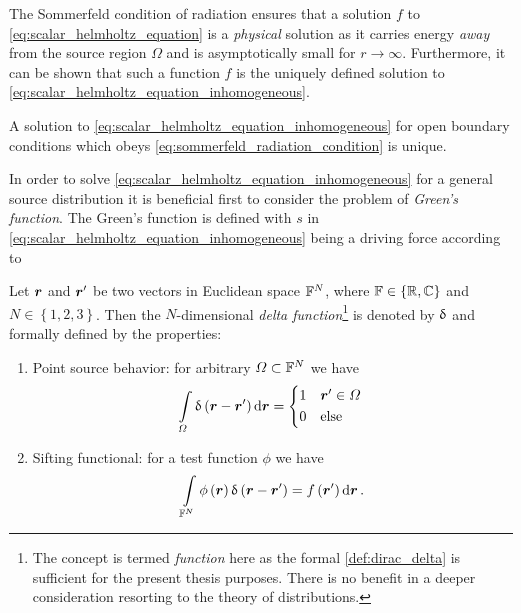 The Sommerfeld condition of radiation ensures that a solution $f$ to
\eqref{eq:scalar_helmholtz_equation} is a \emph{physical}
solution as it carries energy \emph{away} from the source region $\Omega$ and is
asymptotically small for $r \to \infty$.
Furthermore, it can be shown \cite[190]{Sommerfeld1964}\cite[33]{Chew1999}
that such a function $f$ is the uniquely defined solution to
\eqref{eq:scalar_helmholtz_equation_inhomogeneous}.

\begin{corollary}[Uniqueness]
	A solution to \eqref{eq:scalar_helmholtz_equation_inhomogeneous}
	for open boundary conditions which obeys
	\eqref{eq:sommerfeld_radiation_condition} is unique.
\end{corollary}

In order to solve \eqref{eq:scalar_helmholtz_equation_inhomogeneous} for a
general source distribution it is beneficial first to
consider the problem of \emph{Green's function}.
The Green's function is defined with $s$ in
\eqref{eq:scalar_helmholtz_equation_inhomogeneous} being a driving force
according to
\begin{definition}\label{def:dirac_delta}
	Let $\robs$ and $\rsrc$ be two vectors in Euclidean space
	$\mathbb{F}^N$, where $\mathbb{F} \in \left\{\mathbb{R}, \mathbb{C}\right\}$ and
	$N \in \left\{1, 2, 3\right\}$.
	Then the $N$-dimensional \emph{delta function}\footnote{The concept is
	termed \emph{function} here as the formal \cref{def:dirac_delta} is
	sufficient for the present thesis purposes.
	There is no benefit in a deeper consideration resorting to the theory of
	distributions\cite{Strichartz2003}.} is denoted by
	$\operatorname{\updelta}$ and formally defined by the properties:
	\begin{enumerate}[label=(\alph*)]
		\item Point source behavior: for arbitrary $\Omega \subset \mathbb{F}^N$ we
		have
		\begin{equation}
			\int\limits_{\Omega} 
			\diracDelta \left( \robs - \rsrc \right)
			\dd \pvec{r} 
			=
			\begin{cases*}
				1 & $\rsrc \in \Omega$ \\
				0 & \text{else} 
			\end{cases*} 
		\end{equation}
		\item Sifting functional: for a test function $\phi$ 
		\cite{Strichartz2003}\cite[35]{Olver2010} we have
		\begin{equation}\label{eq:delta_filter_property}
			\int\limits_{\F^N} 
			\phi \left( \robs \right)
			\diracDelta \left(\robs-\rsrc\right) =
			f \left( \rsrc \right)
			\dd \pvec{r}
			\, .
		\end{equation}
	\end{enumerate}
\end{definition}

